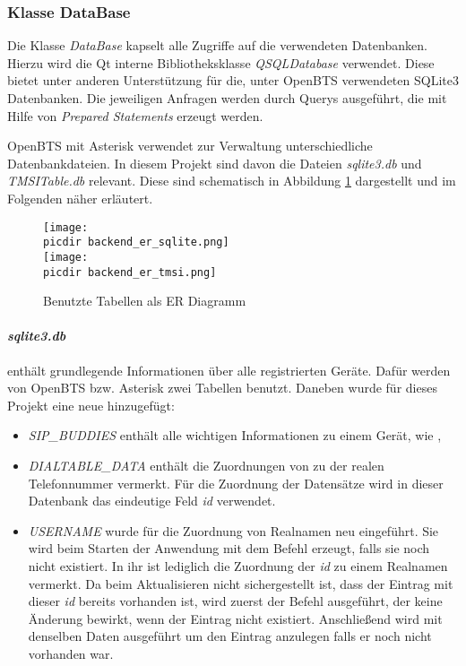 \subsubsection*{Klasse DataBase}

Die Klasse \textit{DataBase} kapselt alle Zugriffe auf die verwendeten Datenbanken. Hierzu wird die Qt interne Bibliotheksklasse \textit{QSQLDatabase} verwendet. Diese bietet unter anderen Unterstützung für die, unter OpenBTS verwendeten SQLite3 Datenbanken. Die jeweiligen Anfragen werden durch \SQL Querys ausgeführt, die mit Hilfe von \textit{Prepared Statements} erzeugt werden.

OpenBTS mit Asterisk verwendet zur Verwaltung unterschiedliche Datenbankdateien. In diesem Projekt sind davon die Dateien \textit{sqlite3.db} und \textit{TMSITable.db} relevant. Diese sind schematisch in Abbildung \ref{fig:database_er} dargestellt und im Folgenden näher erläutert.

\begin{figure}[h!]
	\centering
	\texttt{[image: \\picdir backend\_er\_sqlite.png]} \\
	\texttt{[image: \\picdir backend\_er\_tmsi.png]}
	\caption{Benutzte Tabellen als ER Diagramm}
	\label{fig:database_er}
\end{figure}


\paragraph{\textit{sqlite3.db}} enthält grundlegende Informationen über alle registrierten Geräte. Dafür werden von OpenBTS bzw. Asterisk zwei Tabellen benutzt. Daneben wurde für dieses Projekt eine neue hinzugefügt:

\begin{itemize}
	\item \textit{SIP\_BUDDIES} enthält alle wichtigen Informationen zu einem Gerät, wie \IMSI, 
	\item \textit{DIALTABLE\_DATA} enthält die Zuordnungen von \IMSI zu der realen Telefonnummer vermerkt. Für die Zuordnung der Datensätze wird in dieser Datenbank das eindeutige Feld \textit{id} verwendet.
	
	\item \textit{USERNAME} wurde für die Zuordnung von Realnamen neu eingeführt. Sie wird beim Starten der Anwendung mit dem \SQL Befehl   erzeugt, falls sie noch nicht existiert. In ihr ist lediglich die Zuordnung der \textit{id} zu einem Realnamen vermerkt. Da beim Aktualisieren nicht sichergestellt ist, dass der Eintrag mit dieser \textit{id} bereits vorhanden ist, wird zuerst der Befehl  ausgeführt, der keine Änderung bewirkt, wenn der Eintrag nicht existiert. Anschließend wird  mit denselben Daten ausgeführt um den Eintrag anzulegen falls er noch nicht vorhanden war.
\end{itemize}





